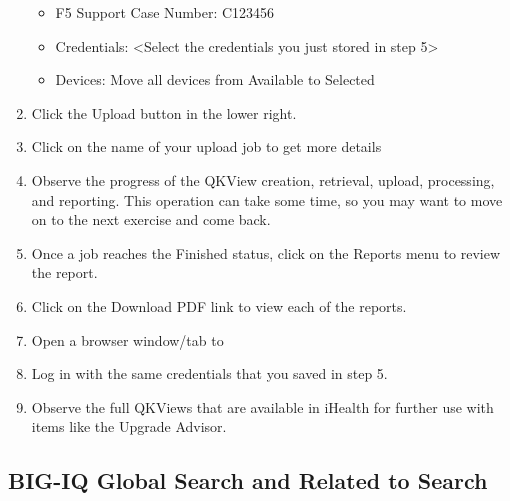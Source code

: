 \documentclass[letterpaper,10pt,english]{sphinxmanual}
\begin{document}
\begin{enumerate}
\begin{itemize}
\item {} 
F5 Support Case Number: C123456

\item {} 
Credentials: \textless{}Select the credentials you just stored in step 5\textgreater{}

\item {} 
Devices: Move all devices from Available to Selected

\end{itemize}


\item {} 
Click the Upload button in the lower right.

\item {} 
Click on the name of your upload job to get more details


\item {} 
Observe the progress of the QKView creation, retrieval, upload,
processing, and reporting. This operation can take some time, so you
may want to move on to the next exercise and come back.

\item {} 
Once a job reaches the Finished status, click on the Reports menu to
review the report.

\item {} 
Click on the Download PDF link to view each of the reports.


\item {} 
Open a browser window/tab to 

\item {} 
Log in with the same credentials that you saved in step 5.

\item {} 
Observe the full QKViews that are available in iHealth for further
use with items like the Upgrade Advisor.


\end{enumerate}


\subsection{BIG-IQ Global Search and Related to Search}
\label{\detokenize{class1/module4/lab5::doc}}\label{\detokenize{class1/module4/lab5:big-iq-global-search-and-related-to-search}}
\end{document}
